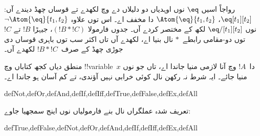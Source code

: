 \documentclass[../../../include/open-logic-section]{subfiles}
\begin{document}
رواجاً اسیں $\eq$ نوں اوہدیاں دو دلیلاں دے وچ لکھدے تے
قوساں چھڈ دیندے آں: $\eq[t_1][t_2]$،
$\Atom{\eq}{t_1,t_2}$ دا مخفف اے۔ اس توں علاوہ
$\lnot \Atom{\eq}{t_1,t_2}$ نوں $\eq/[t_1][t_2]$
لکھ کے مختصر کردے آں۔ جدوں فارمولا $(!B \ast !C)$،
جیہڑا $!B$ تے $!C$ توں دو-مقامی رابطے~$\ast$
نال بنیا اے، لکھدے آں تاں اکثر سب توں باہری قوساں دی جوڑی
چھڈ کے صرف~$!B \ast !C$ لکھدے آں۔

\begin{intro}
منطق دیاں کجھ کتاباں وچ !!{variable}~$x$ دا~$!A$
وچ آنا لازمی منیا جاندا اے، تاں جو
%
%
%
نوں
منیا جائے۔ ایہ شرط نہ رکھن نال کوئی خرابی نہیں آؤندی،
تے کم آسان ہو جاندا اے۔
\end{intro}

\begin{tagblock}{defNot,defOr,defAnd,defIf,defIff,defTrue,defFalse,defEx,defAll}
\begin{defn}
تعریف شدہ عملگراں نال بنے فارمولیاں نوں اینج سمجھیا جاوے:

\begin{tagenumerate}{defTrue,defFalse,defNot,defOr,defAnd,defIf,defIff,defEx,defAll}









\end{tagenumerate}
\end{defn}
\end{tagblock}
\end{document}
